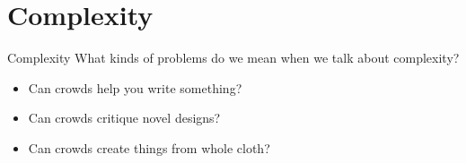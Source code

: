 \documentclass[presentation]{subfiles}
\begin{document}
\section{Complexity}

\begin{frame}{Complexity}
  What kinds of problems do we mean when we talk about complexity?
  \begin{itemize}
    \item<1-> Can crowds help you write something?\\
    \scriptsize{
      \textcite{bernsteinSoylent,Kim:2014:CSI:2556288.2556986,Nebeling:2016:WCW:2858036.2858169}
    }
    \item<2-> Can crowds critique novel designs?\\
    \scriptsize{
      \textcite{yuanAlmost,fuge2014analysis}
    }
    \item<3-> Can crowds create things from whole cloth?\\
    \scriptsize{
      \textcite{KimStoria,Kim2017,Hahn:2016:KAB:2858036.2858364,Lasecki:2014:LSR:2661334.2661352}
    }
  \end{itemize}
\end{frame}
\end{document}
